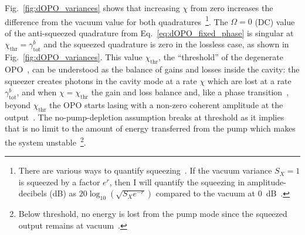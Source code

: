 Fig.~\ref{fig:dOPO_variances} shows that increasing $\chi$ from zero increases the difference from the vacuum value for both quadratures~\footnote{There are various ways to quantify squeezing~\cite{}. If the vacuum variance $S_X=1$ is squeezed by a factor $e^r$, then I will quantify the squeezing in amplitude-decibels (dB) as $20 \log_{10}(\sqrt{S_X e^{-r}})$ compared to the vacuum at 0~dB~\cite{}.}. %
The $\Omega=0$ (DC) value of the anti-squeezed quadrature from Eq.~\ref{eq:dOPO_fixed_phase} is singular at $\chi_\text{thr}=\gamma^b_\text{tot}$ and the squeezed quadrature is zero in the lossless case, as shown in Fig.~\ref{fig:dOPO_variances}. %
This value $\chi_\text{thr}$, the ``threshold'' of the degenerate OPO~\cite{}, %
can be understood as the balance of gains and losses inside the cavity: the squeezer creates photons in the cavity mode at a rate $\chi$ which are lost at a rate $\gamma^b_\text{tot}$, and when $\chi=\chi_\text{thr}$ the gain and loss balance and, like a phase transition~\cite{}, beyond $\chi_\text{thr}$ the OPO starts lasing with a non-zero coherent amplitude at the output~\cite{}. %
The no-pump-depletion assumption breaks at threshold as it implies that is no limit to the amount of energy transferred from the pump which makes the system unstable~\footnote{Below threshold, no energy is lost from the pump mode since the squeezed output remains at vacuum~\cite{}.}. 
